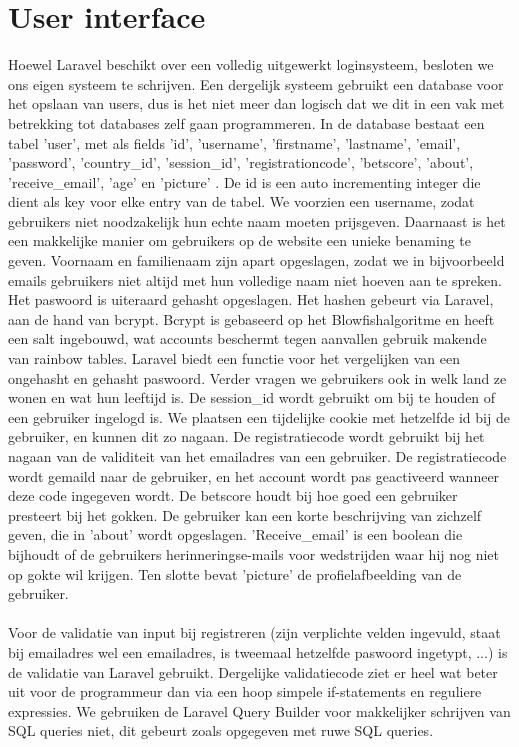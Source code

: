 \documentclass[11pt, a4paper]{article}
\begin{document}
\section{User interface}

Hoewel Laravel beschikt over een volledig uitgewerkt loginsysteem, besloten we ons eigen systeem te schrijven. Een dergelijk systeem gebruikt een database voor het opslaan van users, dus is het niet meer dan logisch dat we dit in een vak met betrekking tot databases zelf gaan programmeren. In de database bestaat een tabel 'user', met als fields 'id', 'username', 'firstname', 'lastname', 'email', 'password', 'country\_id', 'session\_id', 'registrationcode', 'betscore', 'about', 'receive\_email', 'age' en 'picture' . De id is een auto incrementing integer die dient als key voor elke entry van de tabel. We voorzien een username, zodat gebruikers niet noodzakelijk hun echte naam moeten prijsgeven. Daarnaast is het een makkelijke manier om gebruikers op de website een unieke benaming te geven. Voornaam en familienaam zijn apart opgeslagen, zodat we in bijvoorbeeld emails gebruikers niet altijd met hun volledige naam niet hoeven aan te spreken. Het paswoord is uiteraard gehasht opgeslagen. Het hashen gebeurt via Laravel, aan de hand van bcrypt. Bcrypt is gebaseerd op het Blowfishalgoritme en heeft een salt ingebouwd, wat accounts beschermt tegen aanvallen gebruik makende van rainbow tables. Laravel biedt een functie voor het vergelijken van een ongehasht en gehasht paswoord. Verder vragen we gebruikers ook in welk land ze wonen en wat hun leeftijd is. De session\_id wordt gebruikt om bij te houden of een gebruiker ingelogd is. We plaatsen een tijdelijke cookie met hetzelfde id bij de gebruiker, en kunnen dit zo nagaan. De registratiecode wordt gebruikt bij het nagaan van de validiteit van het emailadres van een gebruiker. De registratiecode wordt gemaild naar de gebruiker, en het account wordt pas geactiveerd wanneer deze code ingegeven wordt. De betscore houdt bij hoe goed een gebruiker presteert bij het gokken. De gebruiker kan een korte beschrijving van zichzelf geven, die in 'about' wordt opgeslagen. 'Receive\_email' is een boolean die bijhoudt of de gebruikers herinneringse-mails voor wedstrijden waar hij nog niet op gokte wil krijgen. Ten slotte bevat 'picture' de profielafbeelding van de gebruiker.
\\
\\
Voor de validatie van input bij registreren (zijn verplichte velden ingevuld, staat bij emailadres wel een emailadres, is tweemaal hetzelfde paswoord ingetypt, ...) is de validatie van Laravel gebruikt. Dergelijke validatiecode ziet er heel wat beter uit voor de programmeur dan via een hoop simpele if-statements en reguliere expressies. We gebruiken de Laravel Query Builder voor makkelijker schrijven van SQL queries niet, dit gebeurt zoals opgegeven met ruwe SQL queries.
\end{document}
